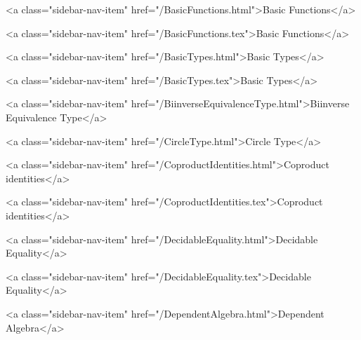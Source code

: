       
    
      
        
          <a class="sidebar-nav-item" href="/BasicFunctions.html">Basic Functions</a>
        
      
    
      
        
          <a class="sidebar-nav-item" href="/BasicFunctions.tex">Basic Functions</a>
        
      
    
      
        
          <a class="sidebar-nav-item" href="/BasicTypes.html">Basic Types</a>
        
      
    
      
        
          <a class="sidebar-nav-item" href="/BasicTypes.tex">Basic Types</a>
        
      
    
      
        
          <a class="sidebar-nav-item" href="/BiinverseEquivalenceType.html">Biinverse Equivalence Type</a>
        
      
    
      
        
          <a class="sidebar-nav-item" href="/CircleType.html">Circle Type</a>
        
      
    
      
        
          <a class="sidebar-nav-item" href="/CoproductIdentities.html">Coproduct identities</a>
        
      
    
      
        
          <a class="sidebar-nav-item" href="/CoproductIdentities.tex">Coproduct identities</a>
        
      
    
      
        
          <a class="sidebar-nav-item" href="/DecidableEquality.html">Decidable Equality</a>
        
      
    
      
        
          <a class="sidebar-nav-item" href="/DecidableEquality.tex">Decidable Equality</a>
        
      
    
      
        
          <a class="sidebar-nav-item" href="/DependentAlgebra.html">Dependent Algebra</a>
        
